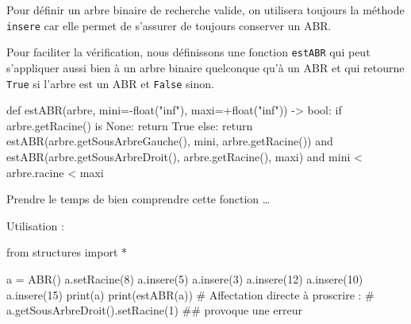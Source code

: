 \documentclass[
  a4paper,
  DIV=11,
  numbers=noendperiod]{scrartcl}
\newenvironment{Shaded}{\begin{snugshade}}{\end{snugshade}}
\newcommand{\BuiltInTok}[1]{\textcolor[rgb]{0.00,0.23,0.31}{#1}}
\newcommand{\CommentTok}[1]{\textcolor[rgb]{0.37,0.37,0.37}{#1}}
\newcommand{\ControlFlowTok}[1]{\textcolor[rgb]{0.00,0.23,0.31}{#1}}
\newcommand{\DecValTok}[1]{\textcolor[rgb]{0.68,0.00,0.00}{#1}}
\newcommand{\ImportTok}[1]{\textcolor[rgb]{0.00,0.46,0.62}{#1}}
\newcommand{\KeywordTok}[1]{\textcolor[rgb]{0.00,0.23,0.31}{#1}}
\newcommand{\NormalTok}[1]{\textcolor[rgb]{0.00,0.23,0.31}{#1}}
\newcommand{\OperatorTok}[1]{\textcolor[rgb]{0.37,0.37,0.37}{#1}}
\newcommand{\StringTok}[1]{\textcolor[rgb]{0.13,0.47,0.30}{#1}}
\newcommand{\VariableTok}[1]{\textcolor[rgb]{0.07,0.07,0.07}{#1}}
\begin{document}
Pour définir un arbre binaire de recherche valide, on utilisera toujours
la méthode \texttt{insere} car elle permet de s'assurer de toujours
conserver un ABR.

Pour faciliter la vérification, nous définissons une fonction
\texttt{estABR} qui peut s'appliquer aussi bien à un arbre binaire
quelconque qu'à un ABR et qui retourne \texttt{True} si l'arbre est un
ABR et \texttt{False} sinon.

\begin{Shaded}
\begin{Highlighting}[]
\KeywordTok{def}\NormalTok{ estABR(arbre, mini}\OperatorTok{={-}}\BuiltInTok{float}\NormalTok{(}\StringTok{"inf"}\NormalTok{), maxi}\OperatorTok{=+}\BuiltInTok{float}\NormalTok{(}\StringTok{"inf"}\NormalTok{)) }\OperatorTok{{-}\textgreater{}} \BuiltInTok{bool}\NormalTok{:}
    \ControlFlowTok{if}\NormalTok{ arbre.getRacine() }\KeywordTok{is} \VariableTok{None}\NormalTok{:}
        \ControlFlowTok{return} \VariableTok{True}
    \ControlFlowTok{else}\NormalTok{:}
        \ControlFlowTok{return}\NormalTok{ estABR(arbre.getSousArbreGauche(), mini, arbre.getRacine()) }\KeywordTok{and} 
\NormalTok{               estABR(arbre.getSousArbreDroit(), arbre.getRacine(), maxi) }\KeywordTok{and} 
\NormalTok{               mini }\OperatorTok{\textless{}}\NormalTok{ arbre.racine }\OperatorTok{\textless{}}\NormalTok{ maxi}
\end{Highlighting}
\end{Shaded}

Prendre le temps de bien comprendre cette fonction \ldots{}

Utilisation :

\begin{Shaded}
\begin{Highlighting}[]
\ImportTok{from}\NormalTok{ structures }\ImportTok{import} \OperatorTok{*}

\NormalTok{a }\OperatorTok{=}\NormalTok{ ABR()}
\NormalTok{a.setRacine(}\DecValTok{8}\NormalTok{)}
\NormalTok{a.insere(}\DecValTok{5}\NormalTok{)}
\NormalTok{a.insere(}\DecValTok{3}\NormalTok{)}
\NormalTok{a.insere(}\DecValTok{12}\NormalTok{)}
\NormalTok{a.insere(}\DecValTok{10}\NormalTok{)}
\NormalTok{a.insere(}\DecValTok{15}\NormalTok{)}
\BuiltInTok{print}\NormalTok{(a)}
\BuiltInTok{print}\NormalTok{(estABR(a))}
\CommentTok{\# Affectation directe à proscrire :}
\CommentTok{\# a.getSousArbreDroit().setRacine(1) \#\# provoque une erreur}
\end{Highlighting}
\end{Shaded}
\end{document}
